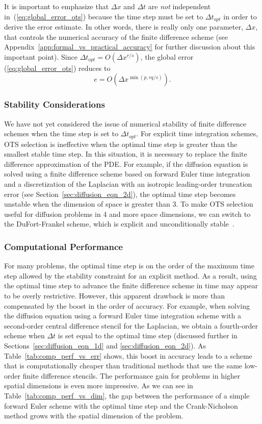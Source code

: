 \documentclass[fleqn,12pt,twoside]{article}
\newcommand{\beq}{\begin{equation}}
\newcommand{\eeq}{\end{equation}}
\def\dt{\Delta t}
\def\dx{\Delta x}
\def\dto{\dt_{opt}}
\begin{document}
It is important to emphasize that $\dx$ and $\dt$ are \emph{not} independent 
in~(\ref{eq:global_error_ots}) because the time step must be set to $\dto$ 
in order to derive the error estimate.  In other words, there is really only 
one parameter, $\dx$, that controls the numerical accuracy of the finite 
difference scheme (see Appendix~\ref{app:formal_vs_practical_accuracy} for 
further discussion about this important point).  Since $\dto = O(\dx^{r/s})$, 
the global error (\ref{eq:global_error_ots}) reduces to
\beq
e = O \left( \dx^{\min(p,rq/s)} \right).
\label{eq:global_error_ots_simplified}
\eeq


\subsubsection*{Stability Considerations}
We have not yet considered the issue of numerical stability of finite
difference schemes when the time step is set to $\dto$.  For explicit time 
integration schemes, OTS selection is ineffective when the optimal time step 
is greater than the smallest stable time step.  In this situation, it is 
necessary to replace the finite difference approximation of the PDE.  
For example, if the diffusion equation is solved using a 
finite difference scheme based on forward Euler time integration and a 
discretization of the Laplacian with an isotropic leading-order truncation 
error (see Section~\ref{sec:diffusion_eqn_2d}), the optimal time step becomes 
unstable when the dimension of space is greater than 3.  To make OTS selection 
useful for diffusion problems in 4 and more space dimensions, we can switch 
to the DuFort-Frankel scheme, which is explicit and unconditionally 
stable~\cite{gko_book}.


\subsubsection*{\label{sec:computational_performance} 
                Computational Performance}
For many problems, the optimal time step is on the order of the maximum 
time step allowed by the stability constraint for an explicit method.  
As a result, using the optimal time step to advance the finite
difference scheme in time may appear to be overly restrictive.
However, this apparent drawback is more than 
compensated by the boost in the order of accuracy.  For example, when solving 
the diffusion equation using a forward Euler time integration scheme with a 
second-order central difference stencil for the Laplacian, we obtain a 
fourth-order scheme when $\dt$ is set equal to the optimal time step 
(discussed further in Sections~\ref{sec:diffusion_eqn_1d} and
\ref{sec:diffusion_eqn_2d}).  
As Table~\ref{tab:comp_perf_vs_err} shows, this boost in accuracy leads to a
scheme that is computationally cheaper than traditional methods that use 
the same low-order finite difference stencils.  The performance gain for 
problems in higher spatial dimensions is even more impressive.  As we can see 
in Table~\ref{tab:comp_perf_vs_dim}, the gap between the performance of a
simple forward Euler scheme with the optimal time step and the Crank-Nicholson
method grows with the spatial dimension of the problem.  
\end{document}
